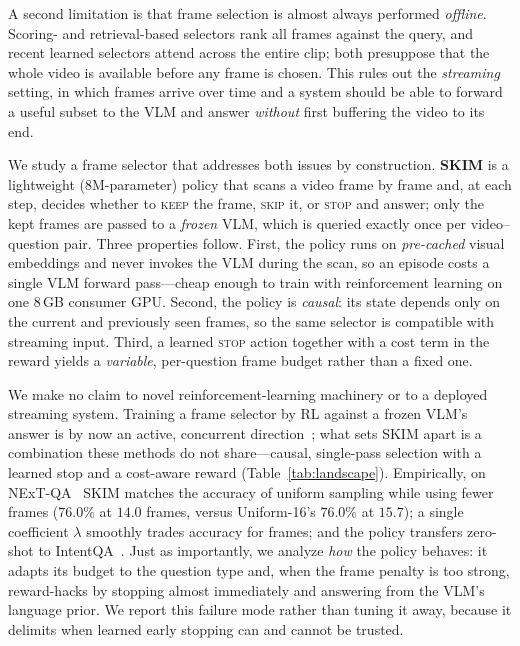 \documentclass{article}
\begin{document}
A second limitation is that frame selection is almost always performed
\emph{offline}. Scoring- and retrieval-based selectors rank all frames against the
query, and recent learned selectors attend across the entire clip; both presuppose
that the whole video is available before any frame is chosen. This rules out the
\emph{streaming} setting, in which frames arrive over time and a system should be
able to forward a useful subset to the VLM and answer \emph{without} first buffering
the video to its end.

We study a frame selector that addresses both issues by construction.
\textbf{SKIM} is a lightweight ($8$M-parameter) policy that scans a video frame by
frame and, at each step, decides whether to \textsc{keep} the frame, \textsc{skip}
it, or \textsc{stop} and answer; only the kept frames are passed to a \emph{frozen}
VLM, which is queried exactly once per video--question pair. Three properties follow.
First, the policy runs on \emph{pre-cached} visual embeddings and never invokes the
VLM during the scan, so an episode costs a single VLM forward pass---cheap enough to
train with reinforcement learning on one $8$\,GB consumer GPU. Second, the policy is
\emph{causal}: its state depends only on the current and previously seen frames, so
the same selector is compatible with streaming input. Third, a learned \textsc{stop}
action together with a cost term in the reward yields a \emph{variable}, per-question
frame budget rather than a fixed one.

We make no claim to novel reinforcement-learning machinery or to a deployed streaming
system. Training a frame selector by RL against a frozen VLM's answer is by now an
active, concurrent direction~\citep{viarl,refocus,hornet}; what sets SKIM apart is a
combination these methods do not share---causal, single-pass selection with a learned
stop and a cost-aware reward (Table~\ref{tab:landscape}). Empirically, on
NExT-QA~\citep{nextqa} SKIM matches the accuracy of uniform sampling while using
fewer frames ($76.0\%$ at $14.0$ frames, versus Uniform-16's $76.0\%$ at $15.7$); a
single coefficient $\lambda$ smoothly trades accuracy for frames; and the policy
transfers zero-shot to IntentQA~\citep{intentqa}. Just as importantly, we analyze
\emph{how} the policy behaves: it adapts its budget to the question type and, when the
frame penalty is too strong, reward-hacks by stopping almost immediately and answering
from the VLM's language prior. We report this failure mode rather than tuning it away,
because it delimits when learned early stopping can and cannot be trusted.
\end{document}
